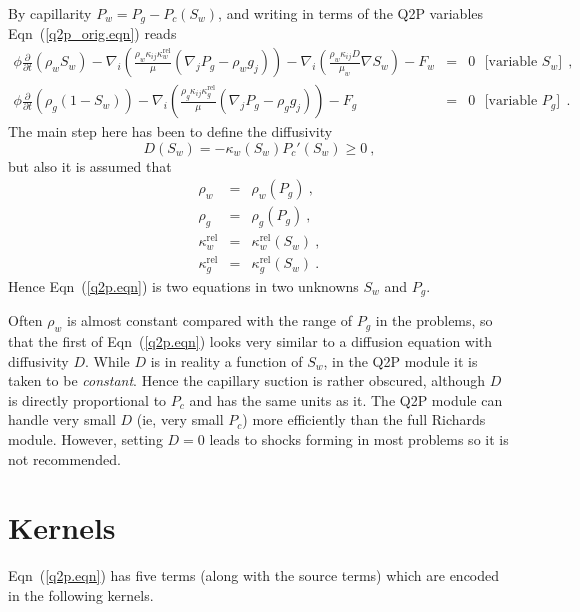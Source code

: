 \documentclass[]{scrreprt}
\begin{document}
By capillarity $P_{w} = P_{g} - P_{c}(S_{w})$, and writing in terms of
the Q2P variables Eqn~(\ref{q2p_orig.eqn}) reads
\begin{eqnarray}
\phi \frac{\partial}{\partial t} \left( \rho_{w} S_{w} \right) - \nabla_{i}
\left( \frac{\rho_{w} \kappa_{ij}\kappa_{w}^{\mathrm{rel}}}{\mu}
(\nabla_{j}P_{g} - \rho_{w} g_{j}) \right) - \nabla_{i}\left(
\frac{\rho_{w}\kappa_{ij}D}{\mu_{w}} \nabla S_{w} \right)
- F_{w} & = & 0 \ \ \ \mbox{[variable $S_{w}$]}\ \ , \nonumber \\
\phi \frac{\partial}{\partial t} \left( \rho_{g} (1 - S_{w}) \right) - \nabla_{i}
\left( \frac{\rho_{g} \kappa_{ij}\kappa_{g}^{\mathrm{rel}}}{\mu} (\nabla_{j}P_{g} - \rho_{g} g_{j}) \right)
- F_{g} & = & 0 \ \ \ \mbox{[variable $P_{g}$]}\ \ .
\label{q2p.eqn}
\end{eqnarray}
The main step here has been to define the diffusivity
\begin{equation}
D(S_{w}) = -\kappa_{w}(S_{w})P_{c}'(S_{w}) \geq 0 \ ,
\end{equation}
but also it is assumed that
\begin{eqnarray}
\rho_{w} & = & \rho_{w}(P_{g}) \ , \nonumber \\
\rho_{g} & = & \rho_{g}(P_{g}) \ , \nonumber \\
\kappa_{w}^{\mathrm{rel}} & = & \kappa_{w}^{\mathrm{rel}}(S_{w}) \ ,
\nonumber \\
\kappa_{g}^{\mathrm{rel}} & = & \kappa_{g}^{\mathrm{rel}}(S_{w}) \ .
\end{eqnarray}
Hence Eqn~(\ref{q2p.eqn}) is two equations in two unknowns $S_{w}$ and
$P_{g}$.

Often $\rho_{w}$ is almost constant compared with the range of $P_{g}$
in the problems, so that the first of Eqn~(\ref{q2p.eqn}) looks very
similar to a diffusion equation with diffusivity $D$.  While $D$ is in
reality a function of $S_{w}$, in the Q2P module it is taken to be
{\em constant}.  Hence the capillary suction is rather obscured,
although $D$ is directly proportional to $P_{c}$ and has the same
units as it.  The Q2P module can handle very small $D$ (ie, very small
$P_{c}$) more efficiently than the full Richards module.  However,
setting $D=0$ leads to shocks forming in most problems so it is not
recommended.


\section{Kernels}

Eqn~(\ref{q2p.eqn}) has five terms (along with the source terms) which
are encoded in the following kernels.
\end{document}
